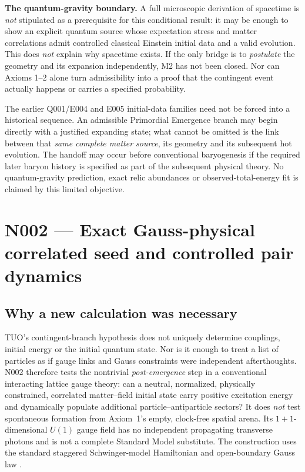 \documentclass[11pt,a4paper]{article}
\theoremstyle{tmon}
\theoremstyle{definition}
\begin{document}
\begin{warningbox}
\textbf{The quantum-gravity boundary.} A full microscopic derivation of spacetime is \emph{not} stipulated as a prerequisite for this conditional result: it may be enough to show an explicit quantum source whose expectation stress and matter correlations admit controlled classical Einstein initial data and a valid evolution. This does \emph{not} explain why spacetime exists. If the only bridge is to \emph{postulate} the geometry and its expansion independently, M2 has not been closed. Nor can Axioms 1--2 alone turn admissibility into a proof that the contingent event actually happens or carries a specified probability.
\end{warningbox}

The earlier Q001/E004 and E005 initial-data families need not be forced into a historical sequence. An admissible Primordial Emergence branch may begin directly with a justified expanding state; what cannot be omitted is the link between that \emph{same complete matter source}, its geometry and its subsequent hot evolution. The handoff may occur before conventional baryogenesis if the required later baryon history is specified as part of the subsequent physical theory. No quantum-gravity prediction, exact relic abundances or observed-total-energy fit is claimed by this limited objective.


\section{N002 --- Exact Gauss-physical correlated seed and controlled pair dynamics}\label{sec:n002}
\subsection{Why a new calculation was necessary}
TUO's contingent-branch hypothesis does not uniquely determine couplings, initial energy or the initial quantum state. Nor is it enough to treat a list of particles as if gauge links and Gauss constraints were independent afterthoughts. N002 therefore tests the nontrivial \emph{post-emergence} step in a conventional interacting lattice gauge theory: can a neutral, normalized, physically constrained, correlated matter--field initial state carry positive excitation energy and dynamically populate additional particle--antiparticle sectors? It does \emph{not} test spontaneous formation from Axiom~1's empty, clock-free spatial arena. Its $1+1$-dimensional $U(1)$ gauge field has no independent propagating transverse photons and is not a complete Standard Model substitute. The construction uses the standard staggered Schwinger-model Hamiltonian and open-boundary Gauss law \cite{N002SchwingerPTEP,N002SchwingerPRD}.
\end{document}
